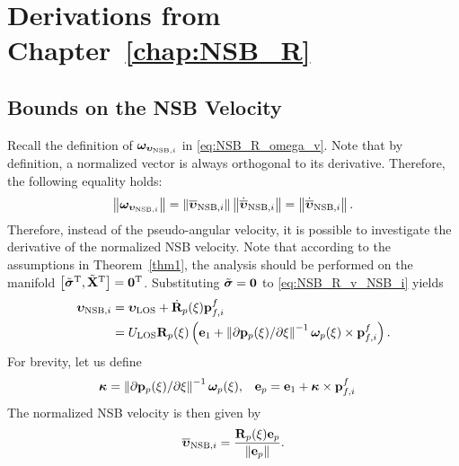 \chapter{Derivations from Chapter~\ref{chap:NSB_R}}
\label{app:NSB_R}

\section{Bounds on the NSB Velocity}
\label{app:v_NSB}
Recall the definition of $\bm{\omega}_{\bm{\upsilon}_{{\rm NSB},i}}$ in \eqref{eq:NSB_R_omega_v}.
Note that by definition, a normalized vector is always orthogonal to its derivative.
Therefore, the following equality holds:
\begin{equation}
    \left\|\bm{\omega}_{\bm{\upsilon}_{{\rm NSB}, i}}\right\| = \left\|\overline{\bm{\upsilon}}_{{\rm NSB}, i}\right\|\left\|\dot{\overline{\bm{\upsilon}}}_{{\rm NSB}, i}\right\|
    = \left\|\dot{\overline{\bm{\upsilon}}}_{{\rm NSB}, i}\right\|.
\end{equation}
Therefore, instead of the pseudo-angular velocity, it is possible to investigate the derivative of the normalized NSB velocity.
Note that according to the assumptions in Theorem~\ref{thm1}, the analysis should be performed on the manifold $\left[\tilde{\bm{\sigma}}^{\mathrm{T}}, \tilde{\mathbf{X}}^{\mathrm{T}}\right] = \mathbf{0}^{\mathrm{T}}$.
Substituting $\tilde{\bm{\sigma}} = \mathbf{0}$ to \eqref{eq:NSB_R_v_NSB_i} yields
\begin{equation}
    \begin{split}
        \bm{\upsilon}_{{\rm NSB}, i} &= \bm{\upsilon}_{\rm LOS} + \dot{\mathbf{R}}_p(\xi)\mathbf{p}_{f,i}^f \\
        &= U_{\rm LOS}\mathbf{R}_p(\xi) \left(\mathbf{e}_1 + \left\|\partial \mathbf{p}_p(\xi) / \partial \xi\right\|^{-1}\bm{\omega}_p(\xi) \times \mathbf{p}_{f,i}^f\right).
    \end{split}
    \label{eq:NSB_R_v_NSB_i_nominal}
\end{equation}
For brevity, let us define
\begin{align}
    \bm{\kappa} &= \left\|\partial \mathbf{p}_p(\xi) / \partial \xi\right\|^{-1}\bm{\omega}_p(\xi), &
    \mathbf{e}_p &= \mathbf{e}_1 + \bm{\kappa} \times \mathbf{p}_{f,i}^f
\end{align}
The normalized NSB velocity is then given by
\begin{equation}
    \overline{\bm{\upsilon}}_{{\rm NSB}, i} = \frac{\mathbf{R}_p(\xi) \mathbf{e}_p}{\left\|\mathbf{e}_p\right\|}.
    \label{eq:NSB_R_v_NSB_i_normalized}
\end{equation}
